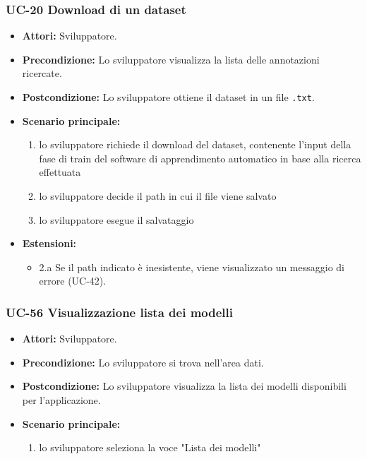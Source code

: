 	\subsubsection{UC-20 Download di un dataset}
		\begin{itemize}
			\item \textbf{Attori:} Sviluppatore.
			\item \textbf{Precondizione:} Lo sviluppatore visualizza la lista delle annotazioni ricercate.
			\item \textbf{Postcondizione:} Lo sviluppatore ottiene il dataset in un file \texttt{.txt}.
			\item \textbf{Scenario principale:}
			\begin{enumerate}
				\item lo sviluppatore richiede il download del dataset, contenente l'input della fase di train del software di apprendimento automatico in base alla ricerca effettuata
				\item lo sviluppatore decide il path in cui il file viene salvato
				\item lo sviluppatore esegue il salvataggio
			\end{enumerate}
			\item \textbf{Estensioni:}
				\begin{itemize}
					\item 2.a Se il path indicato è inesistente, viene visualizzato un messaggio di errore (UC-42).
				\end{itemize}
		\end{itemize}
		
	\subsubsection{UC-56 Visualizzazione lista dei modelli}
		\begin{itemize}
			\item \textbf{Attori:} Sviluppatore.
			\item \textbf{Precondizione:} Lo sviluppatore si trova nell'area dati.
			\item \textbf{Postcondizione:} Lo sviluppatore visualizza la lista dei modelli disponibili per l'applicazione.
			\item \textbf{Scenario principale:}
			\begin{enumerate}
					\item lo sviluppatore seleziona la voce "Lista dei modelli"
				\end{enumerate}
		\end{itemize}	
	
